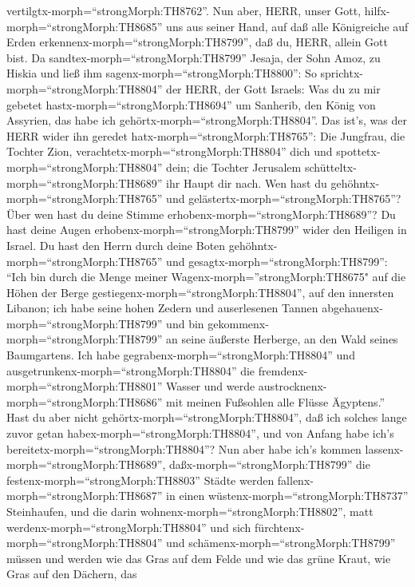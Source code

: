 vertilgtx-morph=``strongMorph:TH8762''.  Nun aber, HERR,
unser Gott, hilfx-morph=``strongMorph:TH8685'' uns aus seiner Hand, auf
daß alle Königreiche auf Erden erkennenx-morph=``strongMorph:TH8799'',
daß du, HERR, allein Gott bist.  Da
sandtex-morph=``strongMorph:TH8799'' Jesaja, der Sohn Amoz, zu Hiskia
und ließ ihm sagenx-morph=``strongMorph:TH8800'': So
sprichtx-morph=``strongMorph:TH8804'' der HERR, der Gott Israels: Was du
zu mir gebetet hastx-morph=``strongMorph:TH8694'' um Sanherib, den König
von Assyrien, das habe ich gehörtx-morph=``strongMorph:TH8804''.
 Das ist's, was der HERR wider ihn geredet
hatx-morph=``strongMorph:TH8765'': Die Jungfrau, die Tochter Zion,
verachtetx-morph=``strongMorph:TH8804'' dich und
spottetx-morph=``strongMorph:TH8804'' dein; die Tochter Jerusalem
schütteltx-morph=``strongMorph:TH8689'' ihr Haupt dir nach.
 Wen hast du gehöhntx-morph=``strongMorph:TH8765'' und
gelästertx-morph=``strongMorph:TH8765''? Über wen hast du deine Stimme
erhobenx-morph=``strongMorph:TH8689''? Du hast deine Augen
erhobenx-morph=``strongMorph:TH8799'' wider den Heiligen in Israel.
 Du hast den Herrn durch deine Boten
gehöhntx-morph=``strongMorph:TH8765'' und
gesagtx-morph=``strongMorph:TH8799'': ``Ich bin durch die Menge meiner
Wagenx-morph=''strongMorph:TH8675" auf die Höhen der Berge
gestiegenx-morph=``strongMorph:TH8804'', auf den innersten Libanon; ich
habe seine hohen Zedern und auserlesenen Tannen
abgehauenx-morph=``strongMorph:TH8799'' und bin
gekommenx-morph=``strongMorph:TH8799'' an seine äußerste Herberge, an
den Wald seines Baumgartens.  Ich habe
gegrabenx-morph=``strongMorph:TH8804'' und
ausgetrunkenx-morph=``strongMorph:TH8804'' die
fremdenx-morph=``strongMorph:TH8801'' Wasser und werde
austrocknenx-morph=``strongMorph:TH8686'' mit meinen Fußsohlen alle
Flüsse Ägyptens.''  Hast du aber nicht
gehörtx-morph=``strongMorph:TH8804'', daß ich solches lange zuvor getan
habex-morph=``strongMorph:TH8804'', und von Anfang habe ich's
bereitetx-morph=``strongMorph:TH8804''? Nun aber habe ich's kommen
lassenx-morph=``strongMorph:TH8689'', daßx-morph=``strongMorph:TH8799''
die festenx-morph=``strongMorph:TH8803'' Städte werden
fallenx-morph=``strongMorph:TH8687'' in einen
wüstenx-morph=``strongMorph:TH8737'' Steinhaufen,  und die
darin wohnenx-morph=``strongMorph:TH8802'', matt
werdenx-morph=``strongMorph:TH8804'' und sich
fürchtenx-morph=``strongMorph:TH8804'' und
schämenx-morph=``strongMorph:TH8799'' müssen und werden wie das Gras auf
dem Felde und wie das grüne Kraut, wie Gras auf den Dächern, das
